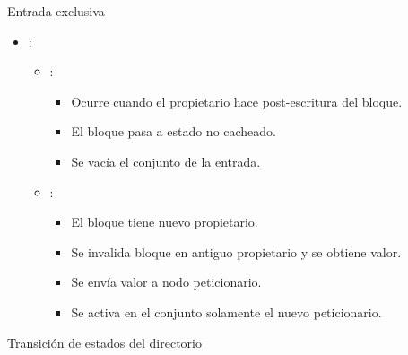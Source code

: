 \begin{frame}[t]{Entrada exclusiva}
\begin{itemize}
  \item {}:
    \begin{itemize}
      \item {}:
        \begin{itemize}
          \item Ocurre cuando el propietario hace post-escritura del bloque.
          \item El bloque pasa a estado no cacheado.
          \item Se vacía el conjunto de la entrada.
        \end{itemize}
      \item {}:
        \begin{itemize}
          \item El bloque tiene nuevo propietario.
          \item Se invalida bloque en antiguo propietario y se obtiene valor.
          \item Se envía valor a nodo peticionario.
          \item Se activa en el conjunto solamente el nuevo peticionario.
        \end{itemize}
    \end{itemize}
\end{itemize}
\end{frame}

\begin{frame}[t]{Transición de estados del directorio}
\makebox[\textwidth][c]{

}
\end{frame}

